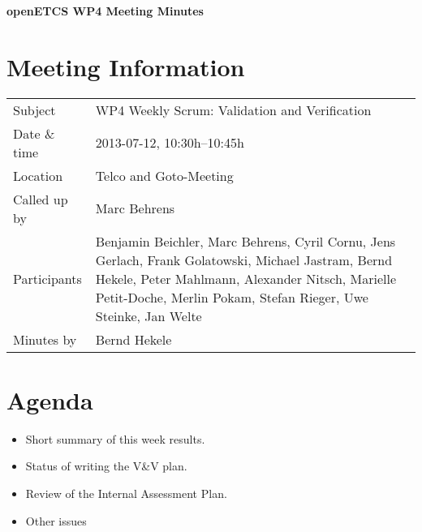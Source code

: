 \documentclass[a4paper, 11pt]{article}
\begin{document}
{\begin{center}\huge\bf openETCS WP4 Meeting Minutes\end{center}}
\section{Meeting Information}

\renewcommand{\arraystretch}{1.5}
\begin{supertabular}{m{.2\textwidth}m{.8\textwidth}}
Subject & WP4 Weekly Scrum: Validation and Verification\\
Date \& time & 2013-07-12, 10:30h--10:45h\\
Location & Telco and Goto-Meeting\\
Called up by & Marc Behrens\\
Participants &
Benjamin Beichler,
Marc Behrens,
Cyril Cornu,
Jens Gerlach,
Frank Golatowski,
Michael Jastram,
Bernd Hekele,
Peter Mahlmann,
Alexander Nitsch,
Marielle Petit-Doche,
Merlin Pokam,
Stefan Rieger,
Uwe Steinke,
Jan Welte
\\

Minutes by & Bernd Hekele\\

\end{supertabular}
\renewcommand{\arraystretch}{1.0}


\section{{Agenda}}
\begin{itemize}
\item Short summary of this week results.
\item Status of writing the V\&V plan.
\item Review of the Internal Assessment Plan.
\item Other issues
\end{itemize}
\end{document}

